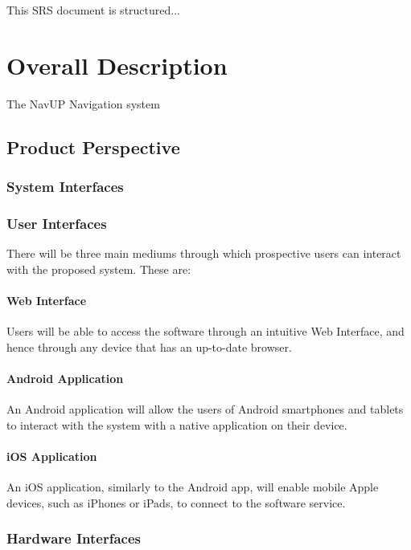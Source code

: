 \documentclass[10pt,a4paper]{article}
\begin{document}
			This SRS document is structured...

	\section{Overall Description}

		The NavUP Navigation system

		\subsection{Product Perspective}

			\subsubsection{System Interfaces}

			\subsubsection{User Interfaces}

				There will be three main mediums through which prospective users can
				interact with the proposed system. These are:

				\paragraph{Web Interface}

					Users will be able to access the software through an intuitive Web
					Interface, and hence through any device that has an up-to-date browser.

				\paragraph{Android Application}

					An Android application will allow the users of Android smartphones
					and tablets to interact with the system with a native application on
					their device.

				\paragraph{iOS Application}

					An iOS application, similarly to the Android app, will enable mobile
					Apple devices, such as iPhones or iPads, to connect to the software
					service.

			\subsubsection{Hardware Interfaces}
\end{document}
